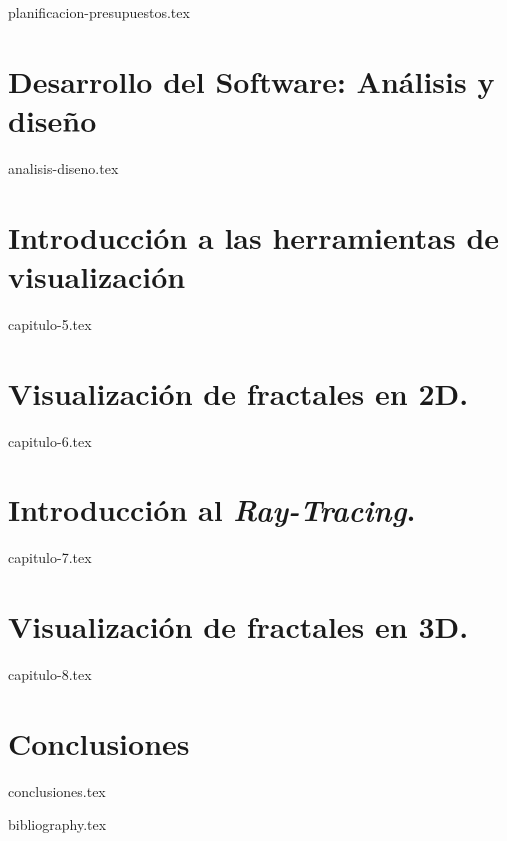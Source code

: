 \documentclass[twoside,openright,11pt]{report}
\begin{document}
{planificacion-presupuestos.tex}

\chapter*{Desarrollo del Software: Análisis y diseño}
\label{chap:analisis-diseno}

{analisis-diseno.tex}

\chapter{Introducción a las herramientas de visualización}
\label{chap:visualizacion}

{capitulo-5.tex}

\chapter{Visualización de fractales en 2D.}
\label{chap:fractales-2D}

{capitulo-6.tex}

\chapter{Introducción al \textit{Ray-Tracing}.}
\label{chap:ray-tracing}

{capitulo-7.tex}

\chapter{Visualización de fractales en 3D.}
\label{chap:fractales-3D}

{capitulo-8.tex}

\chapter*{Conclusiones}
\label{chap:conclusiones}

{conclusiones.tex}


{bibliography.tex}
\end{document}
